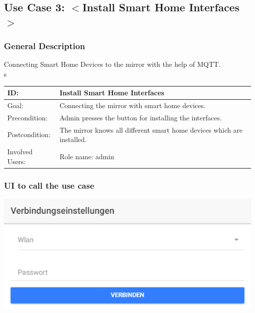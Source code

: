 \documentclass[12pt]{article}
\theoremstyle{definition}
\begin{document}
\subsection{Use Case 3: $<$Install Smart Home Interfaces$>$}
\subsubsection{General Description}
Connecting Smart Home Devices to the mirror with the help of MQTT. \\s
\\
\begin{tabular}{|p{.2\linewidth}|p{.65\linewidth}|}
\hline 
ID: & Install Smart Home Interfaces\\ \hline
Goal: & Connecting the mirror with smart home devices.\\ \hline
Precondition: & Admin presses the button for installing the interfaces.\\ \hline
Postcondition: & The mirror knows all different smart home devices which are installed. \\ \hline
Involved Users: & Role name: admin  \\ \hline
\end{tabular}

\subsubsection{UI to call the use case}
\begin{center}
\includegraphics[scale=.8]{UseCase/StandartWlanEinstellungen.PNG}\\
\end{center}
\end{document}
